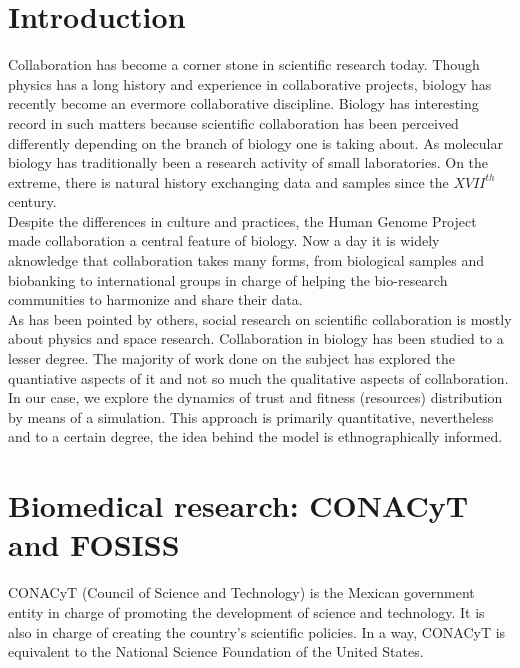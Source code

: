 \section{Introduction}
\label{intro}

Collaboration has become a corner stone in scientific research today.
Though physics has a long history and experience in collaborative
projects, biology has recently become an evermore collaborative
discipline\cite{Vermeulen2013}. Biology has interesting record in such
matters because scientific collaboration has been perceived
differently depending on the branch of biology one is taking about. As
molecular biology has traditionally been a research activity of small
laboratories\cite{KnorrCetina1999,Strasser2006}. On the extreme, there
is natural history exchanging data and samples since the $XVII^{th}$
century\cite{Muller2012,Strasser2012}.\\ 

Despite the differences in culture and practices, the Human Genome
Project made collaboration a central feature of biology. Now a day it
is widely aknowledge that collaboration takes many forms, from
biological samples and biobanking to international groups in charge of
helping the bio-research communities to harmonize and share their
data.\\ 

As has been pointed by others, social research on scientific
collaboration is mostly about physics and space research\cite{Vermeulen2013}.
Collaboration in biology has been studied to a lesser degree. The
majority of work done on the subject has explored the quantiative
aspects of it\cite{Newman2001,HernandezLemus2013} and not so much the
qualitative aspects of collaboration. In our case,
we explore the dynamics of trust and fitness (resources) distribution
by means of a simulation. This approach is primarily quantitative,
nevertheless and to a certain degree, the idea behind the model is
ethnographically informed. 

\section{Biomedical research: CONACyT and FOSISS}
\label{sec:1}
CONACyT (Council of Science and Technology) is the Mexican government
entity in charge of promoting the development of science and 
technology. It is also in charge of creating the country's scientific
policies. In a way, CONACyT is equivalent to the National Science
Foundation of the United States.\\

